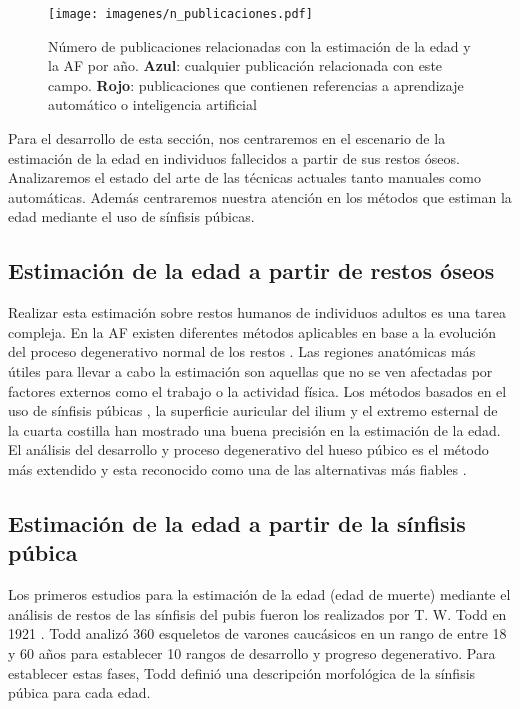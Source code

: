 \begin{figure}[ht!]
    \centering
    \texttt{[image: imagenes/n\_publicaciones.pdf]}
    \caption[Número de publicaciones relacionadas con la estimación de la edad y la AF por año.]{Número de publicaciones relacionadas con la estimación de la edad y la AF por año. \textbf{Azul}: cualquier publicación relacionada con este campo. \textbf{Rojo}: publicaciones que contienen referencias a aprendizaje automático o inteligencia artificial}
    \label{fig:publicaciones}
\end{figure}

Para el desarrollo de esta sección, nos centraremos en el escenario de la estimación de la edad en individuos fallecidos a partir de sus restos óseos. Analizaremos el estado del arte de las técnicas actuales tanto manuales como automáticas. Además centraremos nuestra atención en los métodos que estiman la edad mediante el uso de sínfisis púbicas.


\subsection{Estimación de la edad a partir de restos óseos}

Realizar esta estimación sobre restos humanos de individuos adultos es una tarea compleja. En la AF existen diferentes métodos aplicables en base a la evolución del proceso degenerativo normal de los restos \cite{ubelaker2020recent}. Las regiones anatómicas más útiles para llevar a cabo la estimación son aquellas que no se ven afectadas por factores externos como el trabajo o la actividad física.
Los métodos basados en el uso de sínfisis púbicas \cite{todd1921age,brooks1990skeletal,hartnett2010analysis}, la superficie auricular del ilium \cite{buckberry2002age} y el extremo esternal de la cuarta costilla \cite{icscan1984metamorphosis} han mostrado una buena precisión en la estimación de la edad. El análisis del desarrollo y proceso degenerativo del hueso púbico es el método más extendido y esta reconocido como una de las alternativas más fiables \cite{cunha2009problem,dudzik2015estimating}.

\subsection{Estimación de la edad a partir de la sínfisis púbica}
Los primeros estudios para la estimación de la edad (edad de muerte) mediante el análisis de restos de las sínfisis del pubis fueron los realizados por  T. W. Todd en 1921 \cite{todd1921age}. Todd analizó 360 esqueletos de varones caucásicos en un rango de entre 18 y 60 años para establecer 10 rangos de desarrollo y progreso degenerativo. Para establecer estas fases, Todd definió una descripción morfológica de la sínfisis púbica para cada edad.\\

